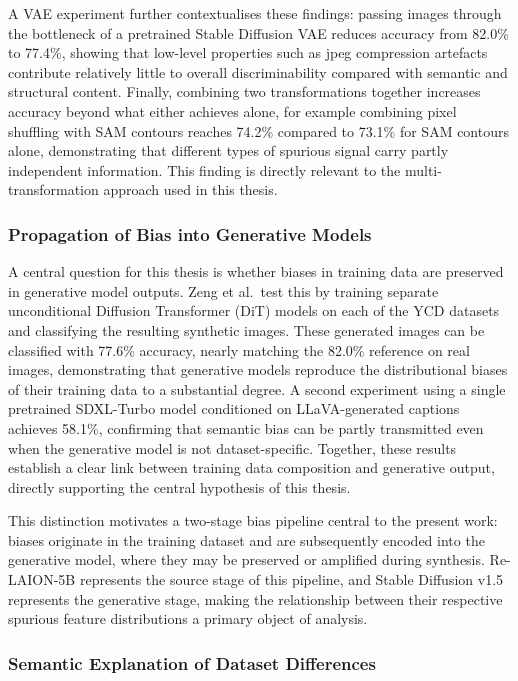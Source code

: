 A VAE experiment further contextualises these findings: passing images through the bottleneck of a
pretrained Stable Diffusion VAE reduces accuracy from 82.0\% to 77.4\%, showing that low-level properties such as jpeg compression artefacts contribute relatively little to
overall discriminability compared with semantic and structural content. Finally, combining two
transformations together increases accuracy beyond what either achieves alone, for example
combining pixel shuffling with SAM contours reaches 74.2\% compared to 73.1\% for SAM
contours alone, demonstrating that different types of spurious signal carry partly independent information. This finding is directly relevant to the multi-transformation
approach used in this thesis.

\subsubsection*{Propagation of Bias into Generative Models}
\label{subsubsec:zeng_generative}

A central question for this thesis is whether biases in training data are preserved in
generative model outputs. Zeng et al.\ test this by training separate unconditional
Diffusion Transformer (DiT) models on each of the YCD datasets and classifying the
resulting synthetic images. These generated images can be classified with 77.6\% accuracy,
nearly matching the 82.0\% reference on real images, demonstrating that generative models reproduce the distributional biases of their training
data to a substantial degree. A second experiment using a single pretrained SDXL-Turbo model
conditioned on LLaVA-generated captions achieves 58.1\%, confirming that semantic bias can be partly transmitted even when the generative model is
not dataset-specific. Together, these results establish a clear link between training data composition and
generative output, directly supporting the central hypothesis of this thesis.

This distinction motivates a two-stage bias pipeline central to the present work: biases originate in the training dataset and are subsequently encoded into the
generative model, where they may be preserved or amplified during synthesis. Re-LAION-5B
represents the source stage of this pipeline, and Stable Diffusion v1.5 represents the
generative stage, making the relationship between their respective spurious feature
distributions a primary object of analysis.

\subsubsection*{Semantic Explanation of Dataset Differences}
\label{subsubsec:zeng_semantic}

